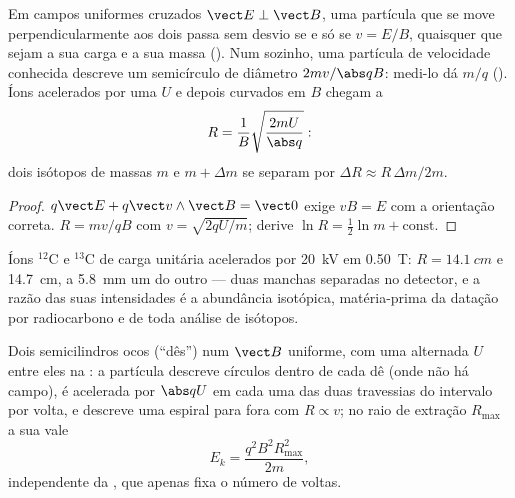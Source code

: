 \begin{proposition}\label{prop:b1:charged-particles:spectrometer}
Em campos uniformes cruzados $\vect E \perp \vect B$, uma partícula que se move
perpendicularmente aos dois passa sem desvio se e só se $v = E/B$, quaisquer que sejam a sua
carga e a sua massa (\emph{}). Num  sozinho, uma
partícula de velocidade conhecida descreve um semicírculo de diâmetro $2mv/\abs qB$:
medi-lo dá $m/q$ (\emph{}). Íons acelerados
por uma  $U$ e depois curvados em $B$ chegam a
\[
R = \frac{1}{B}\sqrt{\frac{2mU}{\abs q}} :
\]
dois isótopos de massas $m$ e $m + \Delta m$ se separam por $\Delta R \approx
R\,\Delta m/2m$.
\end{proposition}

\begin{proof}
$q\vect E + q\vect v\wedge\vect B = \vect 0$ exige $vB = E$ com a orientação
correta. $R = mv/qB$ com $v = \sqrt{2qU/m}$; derive
$\ln R = \tfrac12\ln m + \text{const}$.
\end{proof}

\begin{example}\label{ex:b1:charged-particles:isotopes}
Íons $^{12}$C e $^{13}$C de carga unitária acelerados por \qty{20}{kV}
em \qty{0.50}{T}: $R = \qty{14.1}{cm}$ e \qty{14.7}{cm}, a \qty{5.8}{mm}
um do outro --- duas manchas separadas no detector, e a razão das suas
intensidades é a abundância isotópica, matéria-prima da datação por
radiocarbono e de toda análise de isótopos.
\end{example}

\begin{proposition}[Cíclotron]\label{prop:b1:charged-particles:cyclotron}
Dois semicilindros ocos (``dês'') num $\vect B$ uniforme, com uma
 alternada $U$ entre eles na : a
partícula descreve círculos dentro de cada dê (onde não há campo), é acelerada por
$\abs qU$ em cada uma das duas travessias do intervalo por volta, e descreve uma espiral para fora
com $R \propto v$; no raio de extração $R_{\max}$ a sua  vale
\[
E_k = \frac{q^2B^2R_{\max}^2}{2m},
\]
independente da , que apenas fixa o número de voltas.
\end{proposition}

